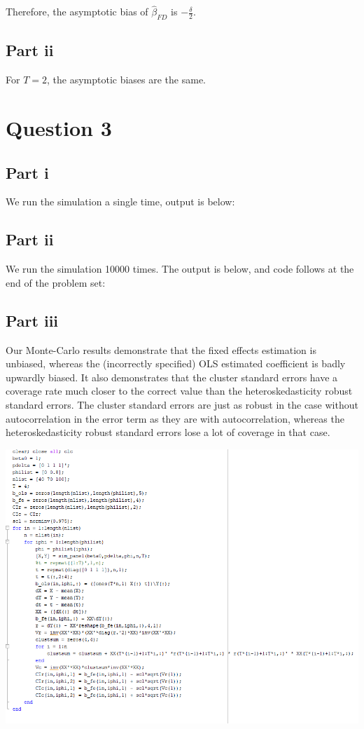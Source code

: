 \documentclass[11pt]{article} %
\begin{document}
Therefore, the asymptotic bias of $\hat{\beta}_{FD}$ is $-\frac{\delta}{2}$.

\subsection{Part ii}

For $T=2$, the asymptotic biases are the same.
\section{Question 3}
\subsection{Part i}
We run the simulation a single time, output is below:

\begin{center}

\end{center}

\subsection{Part ii}
We run the simulation 10000 times. The output is below, and code follows at the end of the problem set:
\begin{center}

\end{center}

\subsection{Part iii}
Our Monte-Carlo results demonstrate that the fixed effects estimation is unbiased, whereas the (incorrectly specified) OLS estimated coefficient is badly upwardly biased. It also demonstrates that the cluster standard errors have a coverage rate much closer to the correct value than the heteroskedasticity robust standard errors.  The cluster standard errors are just as robust in the case without autocorrelation in the error term as they are with autocorrelation, whereas the heteroskedasticity robust standard errors lose a lot of coverage in that case.

\includegraphics{hw6p1}
\end{document}
